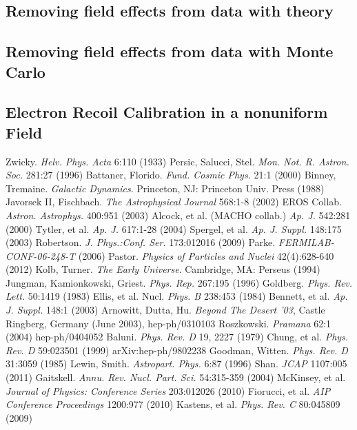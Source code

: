 \documentclass[a4paper,12pt]{article}
\begin{document}
{\subsection{Removing field effects from data with theory}
\subsection{Removing field effects from data with Monte Carlo}
\subsection{Electron Recoil Calibration in a nonuniform Field}


\begin{thebibliography}{1}

 Zwicky.  \emph{Helv. Phys. Acta} 6:110 (1933)
 Persic, Salucci, Stel.  \emph{Mon. Not. R. Astron. Soc.} 281:27 (1996)
 Battaner, Florido.  \emph{Fund. Cosmic Phys.} 21:1 (2000)
 Binney, Tremaine. \emph{Galactic Dynamics}. Princeton, NJ: Princeton Univ. Press (1988)
 Javorsek II, Fischbach. \emph{The Astrophysical Journal} 568:1-8 (2002)
 EROS Collab.  \emph{Astron. Astrophys.} 400:951 (2003)
 Alcock, et al. (MACHO collab.)  \emph{Ap. J.} 542:281 (2000)
 Tytler, et al. \emph{Ap. J.} 617:1-28 (2004)
 Spergel, et al. \emph{Ap. J. Suppl.} 148:175 (2003)
 Robertson. \emph{J. Phys.:Conf. Ser.} 173:012016 (2009)
 Parke.  \emph{FERMILAB-CONF-06-248-T} (2006)
 Pastor.  \emph{Physics of Particles and Nuclei} 42(4):628-640 (2012)
 Kolb, Turner. \emph{The Early Universe}.  Cambridge, MA: Perseus (1994)
 Jungman, Kamionkowski, Griest.  \emph{Phys. Rep.} 267:195 (1996)
 Goldberg.  \emph{Phys. Rev. Lett.} 50:1419 (1983)
 Ellis, et al. Nucl. \emph{Phys. B} 238:453 (1984)
 Bennett, et al. \emph{Ap. J. Suppl.} 148:1 (2003)
 Arnowitt, Dutta, Hu. \emph{Beyond The Desert '03}, Castle Ringberg, Germany (June 2003), hep-ph/0310103
 Roszkowski.  \emph{Pramana} 62:1 (2004) hep-ph/0404052
 Baluni. \emph{Phys. Rev. D} 19, 2227 (1979)
 Chung, et al.  \emph{Phys. Rev. D} 59:023501 (1999) arXiv:hep-ph/9802238
 Goodman, Witten. \emph{Phys. Rev. D} 31:3059 (1985)
 Lewin, Smith. \emph{Astropart. Phys.} 6:87 (1996)
 Shan. \emph{JCAP} 1107:005 (2011)
 Gaitskell.  \emph{Annu. Rev. Nucl. Part. Sci.} 54:315-359 (2004)
 McKinsey, et al.  \emph{Journal of Physics: Conference Series} 203:012026 (2010) 
 Fiorucci, et al.  \emph{AIP Conference Proceedings} 1200:977 (2010)
 Kastens, et al. \emph{Phys. Rev. C} 80:045809 (2009)


\end{thebibliography}}
\end{document}
